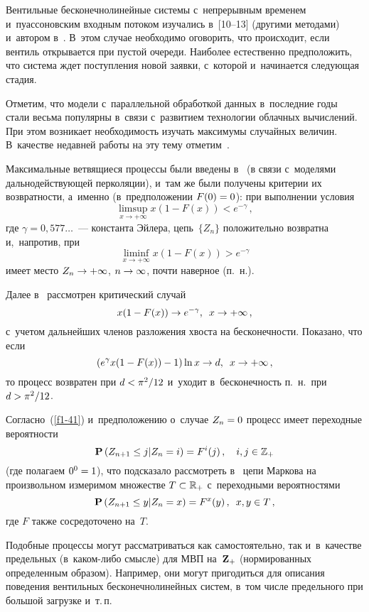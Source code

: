 \begin{multicols}{2}
Вентильные бесконечнолинейные системы с~непрерывным временем 
и~пуассоновским входным потоком изучались в~[10--13]
(другими методами) и~автором в~\cite{Leb-2003, Leb-2004}.
В~этом случае необходимо оговорить, что
происходит, если вентиль открывается при пус\-той очереди.
Наиболее естественно предположить, что сис\-те\-ма ждет по\-ступ\-ле\-ния
новой заявки, с~которой и~начинается сле\-ду\-ющая стадия.

Отметим, что модели с~параллельной обработкой данных в~последние годы
стали весьма популярны в~связи с~развитием технологии облач\-ных вы\-чис\-ле\-ний.
При этом возникает необходимость изучать максимумы случайных величин.
В~качестве недавней работы на эту тему отметим~\cite{Obl}.

Максимальные ветвящиеся процессы были введены в~\cite{Lamp1} (в связи с~моделями дальнодействующей
перколяции), и~там же были получены критерии их воз\-врат\-ности, а~именно
(в~предположении $F(0)\hm=0$): при выполнении условия
\begin{equation}
\label{ulam}
\limsup\limits_{x\to+\infty}x(1-F(x))<e^{-\gamma}\,,
\end{equation}
где $\gamma=0{,}577\ldots$~--- константа Эйлера, цепь~$\{Z_n\}$ положительно
возвратна и,~напротив, при
$$
\liminf\limits_{x\to+\infty}x(1-F(x))>e^{-\gamma}$$
имеет место $Z_n\to \hm+\infty$, $n\hm\to\infty$, поч\-ти наверное (п.~н.).

Далее в~\cite{Lamp2} рассмотрен критический случай 
$$
x(1-F(x))\to e^{-\gamma},\enskip x\to+\infty\,,
$$
 с~учетом дальнейших членов раз\-ло\-же\-ния хвос\-та на бес\-ко\-неч\-ности.
Показано, что если 
$$
\left(e^\gamma x(1-F(x))-1\right)\ln x\to d,\enskip
x\to+\infty\,,
$$
 то процесс возвратен при $d\hm<\pi^2/12$ и~уходит 
в~бес\-ко\-неч\-ность п.~н.\  при $d\hm>\pi^2/12$.

Согласно~(\ref{f1-41}) и~предположению о~случае $Z_n\hm=0$ процесс
имеет переходные вероятности
$$
{\bf P}\left(Z_{n+1}\le j|Z_n=i\right)=F^i(j)\,,\quad i,j\in \mathbb{Z}_+$$
(где полагаем $0^0\hm=1$),
что подсказало  рассмотреть в~\cite{Leb-2005d} цепи Маркова на произвольном измеримом
множестве $T\hm\subset \mathbb{R}_+$ с~переходными вероятностями
\begin{equation}
\label{obo}
{\bf P}\left(Z_{n+1}\le y|Z_n=x\right)=F^x(y)\,,\enskip x,y\in T\,,
\end{equation}
где $F$ также сосредоточено на~$T$.

Подобные процессы могут рас\-смат\-ри\-вать\-ся как самостоятельно,
так и~в~качестве предельных (в~ка\-ком-ли\-бо смысле) для
МВП на~${\bf Z}_+$ (нормированных определенным образом).
Например, они могут пригодиться для описания поведения
вентильных бесконечнолинейных сис\-тем, в~том числе предельного
при большой загрузке и~т.\,п.


\end{multicols}
